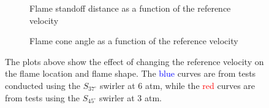 \begin{figure}

\centering

\begin{subfigure}{\linewidth}
  
  \caption{Flame standoff distance as a function of the reference velocity}
  \label{fig:referenceVelocityDistance}
\end{subfigure}

\begin{subfigure}{\linewidth}
  
  \caption{Flame cone angle as a function of the reference velocity}
  \label{fig:referenceVelocityAngle}
\end{subfigure}

\caption[Effect of reference velocity on the flame location and shape]{The plots above show the effect of changing the reference velocity on the flame location and flame shape. The \textcolor{blue}{blue} curves are from tests conducted using the \(S_{37^\circ}\) swirler at 6 atm, while the \textcolor{red}{red} curves are from tests using the \(S_{45^\circ}\) swirler at 3 atm.}

\label{fig:referenceVelocityResults}

\end{figure}

